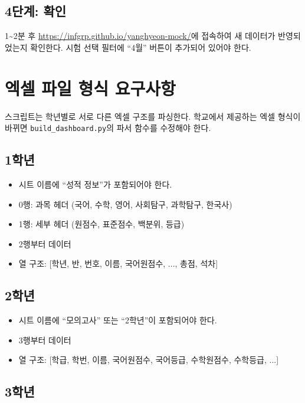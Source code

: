 \documentclass[11pt,a4paper]{article}
\begin{document}
\subsection{4단계: 확인}

1\textasciitilde2분 후 \url{https://infgrp.github.io/yanghyeon-mock/}에 접속하여 새 데이터가 반영되었는지 확인한다. 시험 선택 필터에 ``4월'' 버튼이 추가되어 있어야 한다.


\section{엑셀 파일 형식 요구사항}

스크립트는 학년별로 서로 다른 엑셀 구조를 파싱한다. 학교에서 제공하는 엑셀 형식이 바뀌면 \texttt{build\_dashboard.py}의 파서 함수를 수정해야 한다.

\subsection{1학년}

\begin{itemize}
  \item 시트 이름에 ``성적 정보''가 포함되어야 한다.
  \item 0행: 과목 헤더 (국어, 수학, 영어, 사회탐구, 과학탐구, 한국사)
  \item 1행: 세부 헤더 (원점수, 표준점수, 백분위, 등급)
  \item 2행부터 데이터
  \item 열 구조: [학년, 반, 번호, 이름, 국어원점수, ..., 총점, 석차]
\end{itemize}

\subsection{2학년}

\begin{itemize}
  \item 시트 이름에 ``모의고사'' 또는 ``2학년''이 포함되어야 한다.
  \item 3행부터 데이터
  \item 열 구조: [학급, 학번, 이름, 국어원점수, 국어등급, 수학원점수, 수학등급, ...]
\end{itemize}

\subsection{3학년}
\end{document}
